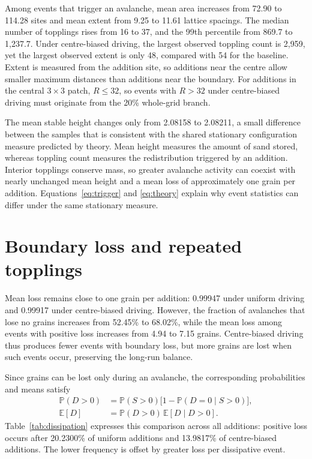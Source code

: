 \documentclass[11pt,a4paper,oneside]{report}
\newcommand{\E}{\mathbb{E}}
\newcommand{\Prob}{\mathbb{P}}
\numberwithin{equation}{chapter}
\begin{document}
Among events that trigger an avalanche, mean area increases from 72.90 to 114.28 sites and mean extent from 9.25 to 11.61 lattice spacings. The median number of topplings rises from 16 to 37, and the 99th percentile from 869.7 to 1,237.7. Under centre-biased driving, the largest observed toppling count is 2,959, yet the largest observed extent is only 48, compared with 54 for the baseline. Extent is measured from the addition site, so additions near the centre allow smaller maximum distances than additions near the boundary. For additions in the central $3\times3$ patch, $R\leq32$, so events with $R>32$ under centre-biased driving must originate from the 20\% whole-grid branch.

The mean stable height changes only from 2.08158 to 2.08211, a small difference between the samples that is consistent with the shared stationary configuration measure predicted by theory. Mean height measures the amount of sand stored, whereas toppling count measures the redistribution triggered by an addition. Interior topplings conserve mass, so greater avalanche activity can coexist with nearly unchanged mean height and a mean loss of approximately one grain per addition. Equations~\eqref{eq:trigger} and \eqref{eq:theory} explain why event statistics can differ under the same stationary measure.

\FloatBarrier
\section{Boundary loss and repeated topplings}
\label{sec:lossinterpretation}
Mean loss remains close to one grain per addition: 0.99947 under uniform driving and 0.99917 under centre-biased driving. However, the fraction of avalanches that lose no grains increases from 52.45\% to 68.02\%, while the mean loss among events with positive loss increases from 4.94 to 7.15 grains. Centre-biased driving thus produces fewer events with boundary loss, but more grains are lost when such events occur, preserving the long-run balance.

Since grains can be lost only during an avalanche, the corresponding probabilities and means satisfy
\begin{equation}
 \begin{aligned}
 \Prob(D>0)&=\Prob(S>0)\bigl[1-\Prob(D=0\mid S>0)\bigr],\\
 \E[D]&=\Prob(D>0)\,\E[D\mid D>0].
 \end{aligned}
 \label{eq:lossdecomposition}
\end{equation}
Table~\ref{tab:dissipation} expresses this comparison across all additions: positive loss occurs after 20.2300\% of uniform additions and 13.9817\% of centre-biased additions. The lower frequency is offset by greater loss per dissipative event.

\end{document}
